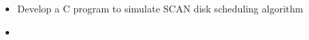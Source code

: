 \documentclass{article}
\newcommand{\question}[2]{
	\item [#1.] #2
}
\newcommand{\answer}[1]{\item [$\rightarrow$] \inputminted{c}{#1}}
\begin{document}
	\begin{itemize}
		\question{10}{
			Develop a C program to simulate SCAN disk scheduling algorithm
		}

		\answer{lab10.c}
	\end{itemize}
\end{document}
